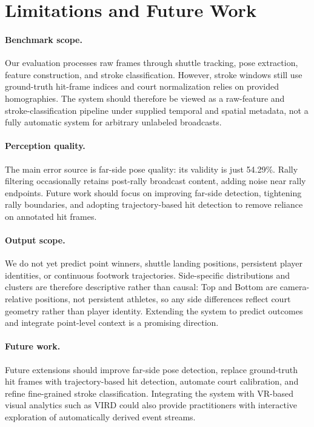 \section{Limitations and Future Work}

\paragraph{Benchmark scope.}
Our evaluation processes raw frames through shuttle tracking, pose extraction,
feature construction, and stroke classification. However, stroke windows still
use ground-truth hit-frame indices and court normalization relies on provided
homographies. The system should therefore be viewed as a raw-feature and
stroke-classification pipeline under supplied temporal and spatial metadata, not
a fully automatic system for arbitrary unlabeled broadcasts.

\paragraph{Perception quality.}
The main error source is far-side pose quality: its validity is just 54.29\%.
Rally filtering occasionally retains post-rally broadcast content, adding noise
near rally endpoints. Future work should focus on improving far-side detection,
tightening rally boundaries, and adopting trajectory-based hit detection to
remove reliance on annotated hit frames.

\paragraph{Output scope.}
We do not yet predict point winners, shuttle landing positions, persistent
player identities, or continuous footwork trajectories. Side-specific
distributions and clusters are therefore descriptive rather than causal: Top
and Bottom are camera-relative positions, not persistent athletes, so any side
differences reflect court geometry rather than player identity. Extending the
system to predict outcomes and integrate point-level context is a promising
direction.

\paragraph{Future work.}
Future extensions should improve far-side pose detection, replace ground-truth
hit frames with trajectory-based hit detection, automate court calibration, and
refine fine-grained stroke classification. Integrating the system with VR-based
visual analytics such as VIRD \cite{vird2023} could also provide practitioners
with interactive exploration of automatically derived event streams.